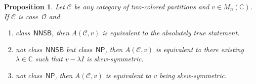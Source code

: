 \documentclass[10pt,a4paper]{amsart}
\numberwithin{equation}{section}
\newtheorem{Proposition}[Theorem]{Proposition}
{ \theoremstyle{definition}
\newtheorem{Definition}[Theorem]{Definition}
\newtheorem{Note}[Theorem]{Note}
\newtheorem{Example}[Theorem]{Example}
\newtheorem{Remark}[Theorem]{Remark}
\newtheorem{Notation}[Theorem]{Notation}
\newtheorem{Assumptions}[Theorem]{Assumptions}
}
\newcommand{\identitymatrix}{I}
\newcommand{\comps}{\mathbb{C}}
\newcommand{\Yc}[1]{\mathfrak{#1}}
\newcommand{\Yb}[1]{\mathsf{#1}}
\newcommand{\squarematrices}[2]{M_{#1}(#2)}
\newcommand{\thedim}{n}
\newcommand{\thecat}{\mathcal{C}}
\newcommand{\thepredicatex}[2]{A(#1,#2)}
\newcommand{\onlyneutralnonsingletonblocks}{\mathsf{NNSB}}
\newcommand{\onlyneutralpartitions}{\mathsf{NP}}
\begin{document}
{
  \newcommand{\somerel}{r}
  \newcommand{\indj}{j}
  \newcommand{\indi}{i}
  \newcommand{\inda}{i}
   \newcommand{\indb}{j}
  \newcommand{\infree}{g}
  \newcommand{\outfree}{j}
  \newcommand{\infreex}[1]{g_{#1}}
  \newcommand{\outfreex}[1]{j_{#1}}
  \newcommand{\thetuple}{x^\themat}
  \newcommand{\thetuplex}[1]{x_{#1}^\themat}
    \newcommand{\incol}{\Yc{c}}
    \newcommand{\inlen}{k}
    \newcommand{\outcol}{\Yc{d}}
    \newcommand{\outlen}{\ell}
    \newcommand{\thepartition}{p}
    \newcommand{\themat}{v}
    \newcommand{\thematx}[2]{v_{#1,#2}}
    \newcommand{\thesum}{\lambda}
  \newcommand{\someblock}{\Yb{B}}
  \newcommand{\specialblock}{\Yb{Y}}
  \newcommand{\blocklabeling}{h}
  \newcommand{\altblocklabeling}{h'}
  \newcommand{\inds}{s}
  \newcommand{\partparamfour}{t}
  \newcommand{\firstsum}{\lambda_1}
  \newcommand{\secondsum}{\lambda_2}
  \newcommand{\firstincol}{\Yc{c}}
    \newcommand{\firstoutcol}{\Yc{d}}
    \newcommand{\firstpartition}{p}
  \newcommand{\secondincol}{\Yc{a}}
    \newcommand{\secondoutcol}{\Yc{b}}
    \newcommand{\secondpartition}{q}
    \newcommand{\anyblock}{\Yb{A}}
    \newcommand{\thetwoblock}{\Yb{Y}}
    \newcommand{\countblock}{\Yb{A}}
    \newcommand{\thethreeblock}{\Yb{Z}}

\begin{Proposition}  \label{proposition:final-case-o}
  Let $\thecat$ be any category of two-colored partitions and $\themat\in\squarematrices{\thedim}{\comps}$.
  If $\thecat$ is case~$\mathcal{O}$ and
    \begin{enumerate}[label=$(\roman*)$]
    \item\label{proposition:final-case-o-1}  class~$\onlyneutralnonsingletonblocks$, then $\thepredicatex{\thecat}{\themat}$ is equivalent to the absolutely true statement.
    \item\label{proposition:final-case-o-2}  not class~$\onlyneutralnonsingletonblocks$ but  class~$\onlyneutralpartitions$, then $\thepredicatex{\thecat}{\themat}$ is equivalent to there existing $\thesum\in\comps$ such that $\themat-\thesum\identitymatrix$ is skew-symmetric.
    \item\label{proposition:final-case-o-3}  not class~$\onlyneutralpartitions$, then $\thepredicatex{\thecat}{\themat}$ is equivalent to $\themat$ being skew-symmetric.
  \end{enumerate}
\end{Proposition}

}
\end{document}
